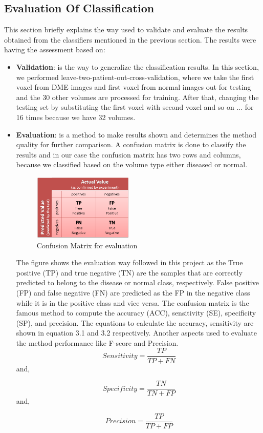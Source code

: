 \subsection{Evaluation Of Classification}
This section briefly explains the way used to validate and evaluate the results obtained from the classifiers mentioned in the previous section.
The results were having the assessment based on:
\begin{itemize}
\item \textbf{Validation}: is the way to generalize the classification results.
In this section, we performed leave-two-patient-out-cross-validation, where we take the first voxel from DME images and first voxel from normal images out for testing and the 30 other volumes are processed for training.
After that, changing the testing set by substituting the first voxel with second voxel and so on ... 
for 16 times because we have 32 volumes.   
\item \textbf{Evaluation}: is a method to make results shown and determines the method quality for further comparison.
A confusion matrix is done to classify the results and in our case the confusion matrix has two rows and columns, because we classified based on the volume type either diseased or normal.
\begin{figure}[htb]
        \centering
        \includegraphics[width = 0.45\textwidth]{figures/Confusion.png} %
  \caption{Confusion Matrix for evaluation \cite{confusion}}
  \label{fig:Confusion}
\end{figure}

The figure shows the evaluation way followed in this project as the True positive (TP) and true negative (TN) are the samples that are correctly predicted to belong to the disease or normal class, respectively.
False positive (FP) and false negative (FN) are predicted as the FP in the negative class while it is in the positive class and vice versa.
The confusion matrix is the famous method to compute the accuracy (ACC), sensitivity (SE), specificity (SP), and precision.
The equations to calculate the accuracy, sensitivity are shown in equation 3.1 and 3.2 respectively.
Another aspects used to evaluate the method performance like F-score and Precision.
\begin{equation}
Sensitivity = \frac{TP}{TP+FN}
\end{equation}
and,

\begin{equation}
Specificity = \frac{TN}{TN+FP}
\end{equation} 
and,

\begin{equation}
Precision = \frac{TP}{TP+FP}
\end{equation}
\end{itemize}

